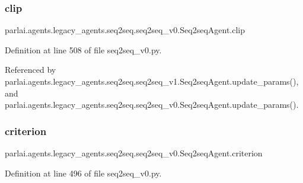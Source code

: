 \subsubsection{\texorpdfstring{clip}{clip}}
{\footnotesize\ttfamily parlai.\+agents.\+legacy\+\_\+agents.\+seq2seq.\+seq2seq\+\_\+v0.\+Seq2seq\+Agent.\+clip}



Definition at line 508 of file seq2seq\+\_\+v0.\+py.



Referenced by parlai.\+agents.\+legacy\+\_\+agents.\+seq2seq.\+seq2seq\+\_\+v1.\+Seq2seq\+Agent.\+update\+\_\+params(), and parlai.\+agents.\+legacy\+\_\+agents.\+seq2seq.\+seq2seq\+\_\+v0.\+Seq2seq\+Agent.\+update\+\_\+params().

\mbox{\label{classparlai_1_1agents_1_1legacy__agents_1_1seq2seq_1_1seq2seq__v0_1_1Seq2seqAgent_ad336994a64a83591ba1388aef3f1d5de}} 
\subsubsection{\texorpdfstring{criterion}{criterion}}
{\footnotesize\ttfamily parlai.\+agents.\+legacy\+\_\+agents.\+seq2seq.\+seq2seq\+\_\+v0.\+Seq2seq\+Agent.\+criterion}



Definition at line 496 of file seq2seq\+\_\+v0.\+py.



